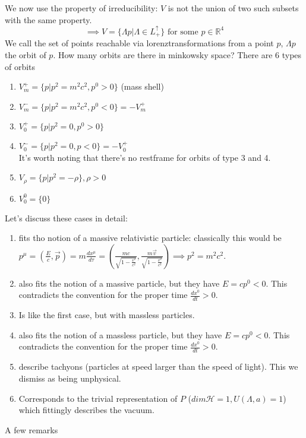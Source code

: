 \documentclass{report}
\begin{document}
  We now use the property of irreducibility: $V$ is not the union of two such subsets with the same property. \[
    \implies V = \{ \Lambda p | \Lambda \in L_+^\uparrow \} \text{ for some } p \in \mathbb{R}^4
  \] 
We call the set of points reachable via lorenztransformations from a point $p$, $\Lambda p$ the orbit of $p$. How many orbits are there in minkowsky space? There are 6 types of orbits
\begin{enumerate}
  \item $V_m^+=\{p | p^2 = m^2c^2, p^0 > 0\}$ (mass shell)
  \item $V_m^-=\{ p | p^2 = m^2c^2, p^0 < 0 \} = -V_m^+$ 
  \item $V_0^+ = \{ p | p^2 = 0, p^0 > 0 \}$
  \item $V_0^- = \{ p | p^2 = 0, p < 0\} = - V_0^+$\\
    It's worth noting that there's no restframe for orbits of type 3 and 4.
  \item $V_\rho = \{ p| p^2 = -\rho\}, \rho > 0$
  \item $V_0^0 = \{0\}$
\end{enumerate}
Let's discuss these cases in detail:
\begin{enumerate}
  \item fits tho notion of a massive relativistic particle: classically this would be $p^\mu = \left( \frac{E}{c}, \vec{p} \right) = m \frac{dx^\mu}{d\tau} = \left( \frac{mc}{\sqrt{1 - \frac{v^2}{c^2}} }, \frac{m \vec{v}}{\sqrt{1 - \frac{v^2}{c^2}} } \right) \implies p^2 = m^2 c^2$.
    \item also fits the notion of a massive particle, but they have $E = c p^0 < 0$. This contradicts the convention for the proper time $\frac{dx^0}{dt} > 0$.
    \item Is like the first case, but with massless particles.
    \item also fits the notion of a massless particle, but they have $E = c p^0 < 0$. This contradicts the convention for the proper time $\frac{dx^0}{dt} > 0$.
    \item describe tachyons (particles at speed larger than the speed of light). This we dismiss as being unphysical.
    \item Corresponds to the trivial representation of $P$ ($dim \mathcal{H} = 1, U\left( \Lambda, a \right) = 1$) which fittingly describes the vacuum.
\end{enumerate}
A few remarks
\end{document}
